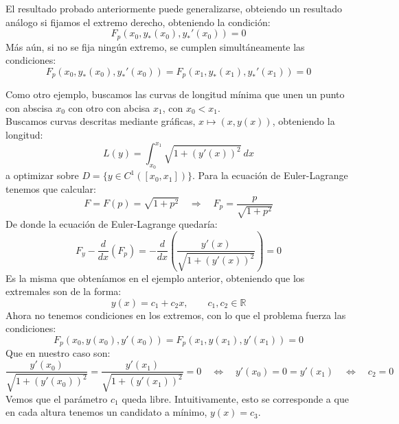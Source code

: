 \noindent
El resultado probado anteriormente puede generalizarse, obteiendo un resultado análogo si fijamos el extremo derecho, obteniendo la condición:
\begin{equation*}
    F_p(x_0,y_\ast(x_0), y_\ast'(x_0)) = 0
\end{equation*}
Más aún, si no se fija ningún extremo, se cumplen simultáneamente las condiciones:
\begin{equation*}
    F_p(x_0,y_\ast(x_0), y_\ast'(x_0)) = F_p(x_1,y_\ast(x_1), y_\ast'(x_1)) = 0
\end{equation*}

\begin{ejemplo}
    Como otro ejemplo, buscamos las curvas de longitud mínima que unen un punto con abscisa $x_0$ con otro con abcisa $x_1$, con $x_0<x_1$.\\

    \noindent
    Buscamos curvas descritas mediante gráficas, $x\longmapsto (x,y(x))$, obteniendo la longitud:
    \begin{equation*}
        L(y) = \int_{x_0}^{x_1} \sqrt{1+{(y'(x))}^{2}}~dx 
    \end{equation*}
    a optimizar sobre $D = \{y\in C^1([x_0,x_1])\}$. Para la ecuación de Euler-Lagrange tenemos que calcular:
    \begin{equation*}
        F = F(p) = \sqrt{1+p^2} \quad\Longrightarrow\quad F_p = \frac{p}{\sqrt{1+p^2}}
    \end{equation*}
    De donde la ecuación de Euler-Lagrange quedaría:
    \begin{equation*}
        F_y - \frac{d}{dx}(F_p) = -\frac{d}{dx}\left(\frac{y'(x)}{\sqrt{1+{(y'(x))}^{2}}}\right) = 0
    \end{equation*}
    Es la misma que obteníamos en el ejemplo anterior, obteniendo que los extremales son de la forma:
    \begin{equation*}
        y(x) = c_1 + c_2x, \qquad c_1,c_2\in \mathbb{R}
    \end{equation*}
    Ahora no tenemos condiciones en los extremos, con lo que el problema fuerza las condiciones:
    \begin{equation*}
        F_p(x_0,y(x_0),y'(x_0)) = F_p(x_1,y(x_1),y'(x_1)) = 0
    \end{equation*}
    Que en nuestro caso son:
    \begin{equation*}
        \frac{y'(x_0)}{\sqrt{1+{(y'(x_0))}^{2}}} = \frac{y'(x_1)}{\sqrt{1+{(y'(x_1))}^{2}}} = 0 \quad\Longleftrightarrow\quad y'(x_0) = 0 = y'(x_1) \quad\Longleftrightarrow\quad c_2 = 0
    \end{equation*}
    Vemos que el parámetro $c_1$ queda libre. Intuitivamente, esto se corresponde a que en cada altura tenemos un candidato a mínimo, $y(x) = c_3$.
\end{ejemplo}




